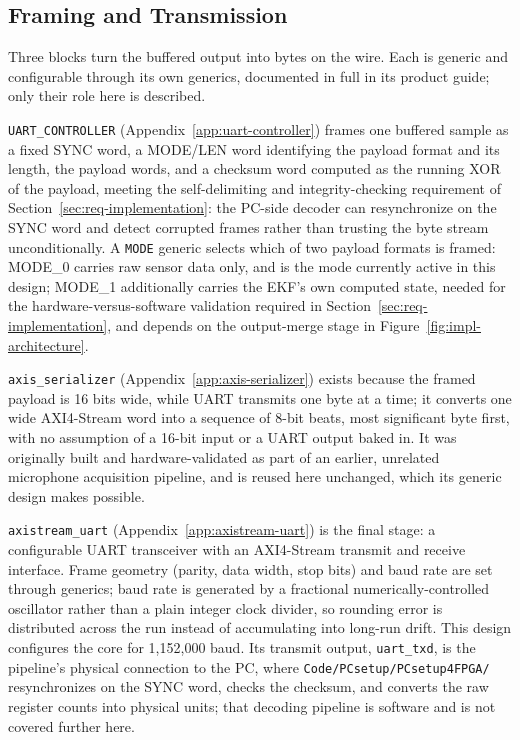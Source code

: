 \documentclass[12pt,a4paper]{article}
\begin{document}
{%
\subsection{Framing and Transmission}
\label{sec:impl-framing}

Three blocks turn the buffered output into bytes on the wire. Each is
generic and configurable through its own generics, documented in full
in its product guide; only their role here is described.

\texttt{UART\_CONTROLLER} (Appendix~\ref{app:uart-controller}) frames
one buffered sample as a fixed SYNC word, a MODE/LEN word identifying
the payload format and its length, the payload words, and a checksum
word computed as the running XOR of the payload, meeting the
self-delimiting and integrity-checking requirement of
Section~\ref{sec:req-implementation}: the PC-side decoder can
resynchronize on the SYNC word and detect corrupted frames rather than
trusting the byte stream unconditionally. A \texttt{MODE} generic
selects which of two payload formats is framed: MODE\_0 carries raw
sensor data only, and is the mode currently active in this design;
MODE\_1 additionally carries the EKF's own computed state, needed for
the hardware-versus-software validation required in
Section~\ref{sec:req-implementation}, and depends on the output-merge
stage in Figure~\ref{fig:impl-architecture}.

\texttt{axis\_serializer} (Appendix~\ref{app:axis-serializer}) exists
because the framed payload is 16 bits wide, while UART transmits one
byte at a time; it converts one wide AXI4-Stream word into a sequence of
8-bit beats, most significant byte first, with no assumption of a
16-bit input or a UART output baked in. It was originally built and
hardware-validated as part of an earlier, unrelated microphone
acquisition pipeline, and is reused here unchanged, which its generic
design makes possible.

\texttt{axistream\_uart} (Appendix~\ref{app:axistream-uart}) is the
final stage: a configurable UART transceiver with an AXI4-Stream
transmit and receive interface. Frame geometry (parity, data width,
stop bits) and baud rate are set through generics; baud rate is
generated by a fractional numerically-controlled oscillator rather than
a plain integer clock divider, so rounding error is distributed across
the run instead of accumulating into long-run drift. This design
configures the core for 1{,}152{,}000 baud. Its transmit output,
\texttt{uart\_txd}, is the pipeline's physical connection to the PC,
where \texttt{Code/PCsetup/PCsetup4FPGA/} resynchronizes on the SYNC
word, checks the checksum, and converts the raw register counts into
physical units; that decoding pipeline is software and is not covered
further here.

}
\end{document}
